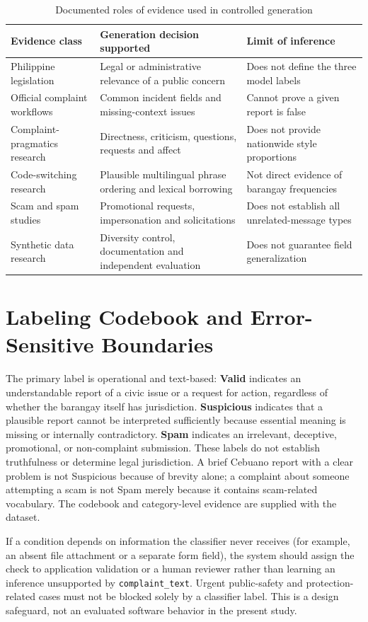 \begin{table}[H]\centering\caption{Documented roles of evidence used in controlled generation}\small\begin{tabularx}{\textwidth}{p{}Xp{}}\toprule
Evidence class & Generation decision supported & Limit of inference\\\midrule
Philippine legislation & Legal or administrative relevance of a public concern & Does not define the three model labels\\
Official complaint workflows & Common incident fields and missing-context issues & Cannot prove a given report is false\\
Complaint-pragmatics research & Directness, criticism, questions, requests and affect & Does not provide nationwide style proportions\\
Code-switching research & Plausible multilingual phrase ordering and lexical borrowing & Not direct evidence of barangay frequencies\\
Scam and spam studies & Promotional requests, impersonation and solicitations & Does not establish all unrelated-message types\\
Synthetic data research & Diversity control, documentation and independent evaluation & Does not guarantee field generalization\\\bottomrule
\end{tabularx}\end{table}

\section{Labeling Codebook and Error-Sensitive Boundaries}
The primary label is operational and text-based: \textbf{Valid} indicates an understandable report of a civic issue or a request for action, regardless of whether the barangay itself has jurisdiction. \textbf{Suspicious} indicates that a plausible report cannot be interpreted sufficiently because essential meaning is missing or internally contradictory. \textbf{Spam} indicates an irrelevant, deceptive, promotional, or non-complaint submission. These labels do not establish truthfulness or determine legal jurisdiction. A brief Cebuano report with a clear problem is not Suspicious because of brevity alone; a complaint about someone attempting a scam is not Spam merely because it contains scam-related vocabulary. The codebook and category-level evidence are supplied with the dataset.

If a condition depends on information the classifier never receives (for example, an absent file attachment or a separate form field), the system should assign the check to application validation or a human reviewer rather than learning an inference unsupported by \texttt{complaint\_text}. Urgent public-safety and protection-related cases must not be blocked solely by a classifier label. This is a design safeguard, not an evaluated software behavior in the present study.

